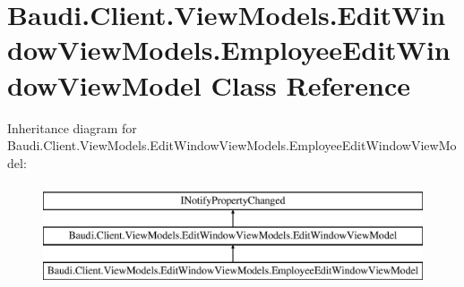 \hypertarget{class_baudi_1_1_client_1_1_view_models_1_1_edit_window_view_models_1_1_employee_edit_window_view_model}{}\section{Baudi.\+Client.\+View\+Models.\+Edit\+Window\+View\+Models.\+Employee\+Edit\+Window\+View\+Model Class Reference}
\label{class_baudi_1_1_client_1_1_view_models_1_1_edit_window_view_models_1_1_employee_edit_window_view_model}
Inheritance diagram for Baudi.\+Client.\+View\+Models.\+Edit\+Window\+View\+Models.\+Employee\+Edit\+Window\+View\+Model\+:\begin{figure}[H]
\begin{center}
\leavevmode
\includegraphics[height=3.000000cm]{class_baudi_1_1_client_1_1_view_models_1_1_edit_window_view_models_1_1_employee_edit_window_view_model}
\end{center}
\end{figure}
